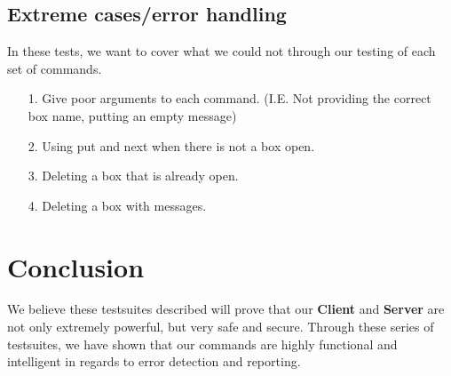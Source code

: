 \documentclass{article}
\begin{document}
        \subsection{Extreme cases/error handling}
        In these tests, we want to cover what we could not through our testing of each set of commands.
            \begin{itemize}
                \item[1.] Give poor arguments to each command. (I.E. Not providing the correct box name, putting an empty message)
                \item[2.] Using put and next when there is not a box open.
                \item[3.] Deleting a box that is already open.
                \item[4.] Deleting a box with messages.    
            \end{itemize}
    \section{Conclusion}
        We believe these testsuites described will prove that our \textbf{Client} and \textbf{Server} are not only extremely powerful, but very safe and secure. Through these series of testsuites, we have shown that our commands are highly functional and intelligent in regards to error detection and reporting.
\end{document}
